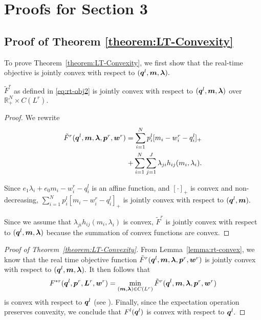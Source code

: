 \appendix

\section{Proofs for Section 3}

\subsection{Proof of Theorem \ref{theorem:LT-Convexity}}
\label{proof:convexity}

To prove Theorem~\ref{theorem:LT-Convexity}, we first show that the
real-time objective is jointly convex with respect to
$(\boldsymbol{q}^l,\boldsymbol{m},\boldsymbol{\lambda}).$
\begin{lemma}
	\label{lemma:rt-convex}
	$\tilde{F}^r$ as defined in \eqref{eq:rt-obj2} is jointly
        convex with respect to
        $(\boldsymbol{q}^l,\boldsymbol{m},\boldsymbol{\lambda})$ over
        $\mathbb{R}^N_+ \times C(L^r).$
\end{lemma}
\begin{proof}
	We rewrite
	\begin{eqnarray}
          \tilde{F}^r(\boldsymbol{q}^l,\boldsymbol{m},\boldsymbol{\lambda},\boldsymbol{p}^r,\boldsymbol{w}^r) = 
          \sum_{i=1}^{N} p^l_i [m_i-w^r_i-q^l_i]_+ \nonumber \\
          + \sum_{i=1}^{N}\sum_{j=1}^{J} \lambda_{ji} h_{ij}(m_i,\lambda_i).
	\end{eqnarray}
	
	
	Since $e_1 \lambda_i+ e_0 m_i-w^r_i-q^l_i$ is an affine function, and $[\cdot]_+$
        is convex and non-decreasing, $\sum_{i=1}^{N} p^l_i
        [m_i-w^r_i-q^l_i]_+$ is jointly convex with respect to
        $(\boldsymbol{q}^l,\boldsymbol{m}).$

	
	Since we assume that $\lambda_{ji} h_{ij}(m_i,\lambda_i)$ is convex, 
        $\tilde{F}^r$ is jointly convex with respect to
        $(\boldsymbol{q}^l,\boldsymbol{m},\boldsymbol{\lambda})$ because the
        summation of convex functions are convex.
\end{proof}

\begin{proof}[Proof of Theorem~\ref{theorem:LT-Convexity}]
  From Lemma~\ref{lemma:rt-convex}, we know that the real time
  objective function
  $\tilde{F}^r(\boldsymbol{q}^l,\boldsymbol{m},\boldsymbol{\lambda},\boldsymbol{p}^r,\boldsymbol{w}^r)$
  is jointly convex with respect to
  $(\boldsymbol{q}^l,\boldsymbol{m},\boldsymbol{\lambda}).$ It then follows
  that $$F^{*r}(\boldsymbol{q}^l,\boldsymbol{p}^r, \boldsymbol{L}^r, \boldsymbol{w}^r)
  = \min_{(\boldsymbol{m},\boldsymbol{\lambda}) \in C(L^r)}
  \tilde{F}^r(\boldsymbol{q}^l,\boldsymbol{m},\boldsymbol{\lambda},\boldsymbol{p}^r,\boldsymbol{w}^r)$$
  is convex with respect to $\boldsymbol{q}^l$ (see
  \cite{boyd2004convex}). Finally, since the expectation operation
  preserves convexity, we conclude that $F^l(\boldsymbol{q}^l)$ is convex
  with respect to $\boldsymbol{q}^l.$
\end{proof}


